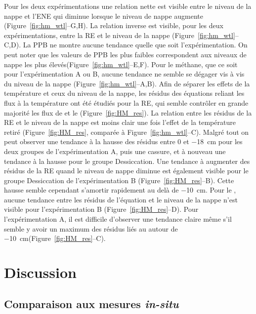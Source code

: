 Pour les deux expérimentations une relation nette est visible entre le niveau de la nappe et l'ENE qui diminue lorsque le niveau de nappe augmente (Figure~\ref{fig:hm_wtl}--G,H).
La relation inverse est visible, pour les deux expérimentations, entre la RE et le niveau de la nappe (Figure~\ref{fig:hm_wtl}--C,D).
La PPB ne montre aucune tendance quelle que soit l'expérimentation.
On peut noter que les valeurs de PPB les plus faibles correspondent aux niveaux de nappe les plus élevés(Figure~\ref{fig:hm_wtl}--E,F).
Pour le méthane, que ce soit pour l'expérimentation A ou B, aucune tendance ne semble se dégager vis à vis du niveau de la nappe (Figure~\ref{fig:hm_wtl}--A,B).
Afin de séparer les effets de la température et ceux du niveau de la nappe, les résidus des équations reliant les flux à la température ont été étudiés pour la RE, qui semble contrôler en grande majorité les flux de \coo et le \chh (Figure~\ref{fig:HM_res}).
La relation entre les résidus de la RE et le niveau de la nappe est moins clair une fois l'effet de la température retiré (Figure~\ref{fig:HM_res}, comparée à Figure~\ref{fig:hm_wtl}--C).
Malgré tout on peut observer une tendance à la hausse des résidus entre 0 et \SI{-18}{\centi\metre} pour les deux groupes de l'expérimentation A, puis une cassure, et à nouveau une tendance à la hausse pour le groupe Dessiccation.
Une tendance à augmenter des résidus de la RE quand le niveau de nappe diminue est également visible pour le groupe Dessiccation de l'expérimentation B (Figure~\ref{fig:HM_res}--B).
Cette hausse semble cependant s'amortir rapidement au delà de \SI{-10}{\centi\metre}.
Pour le \chh, aucune tendance entre les résidus de l'équation et le niveau de la nappe n'est visible pour l'expérimentation B (Figure~\ref{fig:HM_res}--D).
Pour l'expérimentation A, il est difficile d'observer une tendance claire même s'il semble y avoir un maximum des résidus liés au \chh autour de \SI{-10}{\centi\metre}(Figure~\ref{fig:HM_res}--C).


\section{Discussion}

\subsection{Comparaison aux mesures \textit{in-situ}}
\subsubsection{\chh}

